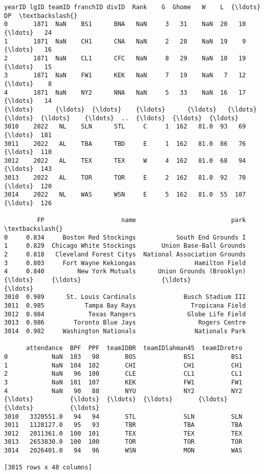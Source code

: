 \documentclass[11pt]{article}
\makeatletter
\newcommand{\boxspacing}{\kern\kvtcb@left@rule\kern\kvtcb@boxsep}
\newcommand{\prompt}[4]{
        {\ttfamily\llap{{\color{#2}[#3]:\hspace{3pt}#4}}\vspace{-\baselineskip}}
    }
\makeatother
\begin{document}
            \begin{tcolorbox}[breakable, size=fbox, boxrule=.5pt, pad at break*=1mm, opacityfill=0]
\prompt{Out}{outcolor}{14}{\boxspacing}
\begin{Verbatim}[commandchars=\\\{\}]
      yearID lgID teamID franchID divID  Rank    G  Ghome   W    L  {\ldots}   DP  \textbackslash{}
0       1871  NaN    BS1      BNA   NaN     3   31    NaN  20   10  {\ldots}   24
1       1871  NaN    CH1      CNA   NaN     2   28    NaN  19    9  {\ldots}   16
2       1871  NaN    CL1      CFC   NaN     8   29    NaN  10   19  {\ldots}   15
3       1871  NaN    FW1      KEK   NaN     7   19    NaN   7   12  {\ldots}    8
4       1871  NaN    NY2      NNA   NaN     5   33    NaN  16   17  {\ldots}   14
{\ldots}      {\ldots}  {\ldots}    {\ldots}      {\ldots}   {\ldots}   {\ldots}  {\ldots}    {\ldots}  ..  {\ldots}  {\ldots}  {\ldots}
3010    2022   NL    SLN      STL     C     1  162   81.0  93   69  {\ldots}  181
3011    2022   AL    TBA      TBD     E     1  162   81.0  86   76  {\ldots}  110
3012    2022   AL    TEX      TEX     W     4  162   81.0  68   94  {\ldots}  143
3013    2022   AL    TOR      TOR     E     2  162   81.0  92   70  {\ldots}  120
3014    2022   NL    WAS      WSN     E     5  162   81.0  55  107  {\ldots}  126

         FP                     name                          park  \textbackslash{}
0     0.834     Boston Red Stockings           South End Grounds I
1     0.829  Chicago White Stockings       Union Base-Ball Grounds
2     0.818   Cleveland Forest Citys  National Association Grounds
3     0.803     Fort Wayne Kekiongas                Hamilton Field
4     0.840         New York Mutuals      Union Grounds (Brooklyn)
{\ldots}     {\ldots}                      {\ldots}                           {\ldots}
3010  0.989      St. Louis Cardinals             Busch Stadium III
3011  0.985           Tampa Bay Rays               Tropicana Field
3012  0.984            Texas Rangers              Globe Life Field
3013  0.986        Toronto Blue Jays                 Rogers Centre
3014  0.982     Washington Nationals                Nationals Park

      attendance  BPF  PPF  teamIDBR  teamIDlahman45  teamIDretro
0            NaN  103   98       BOS             BS1          BS1
1            NaN  104  102       CHI             CH1          CH1
2            NaN   96  100       CLE             CL1          CL1
3            NaN  101  107       KEK             FW1          FW1
4            NaN   90   88       NYU             NY2          NY2
{\ldots}          {\ldots}  {\ldots}  {\ldots}       {\ldots}             {\ldots}          {\ldots}
3010   3320551.0   94   94       STL             SLN          SLN
3011   1128127.0   95   93       TBR             TBA          TBA
3012   2011361.0  100  101       TEX             TEX          TEX
3013   2653830.0  100  100       TOR             TOR          TOR
3014   2026401.0   94   96       WSN             MON          WAS

[3015 rows x 48 columns]
\end{Verbatim}
\end{tcolorbox}
        
\end{document}
